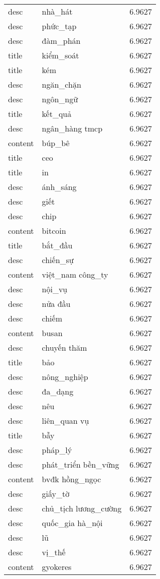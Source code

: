 \documentclass{article}
\begin{document}
\begin{tabular}{lll}
desc & nhà\_hát & 6.9627\\
desc & phức\_tạp & 6.9627\\
desc & đàm\_phán & 6.9627\\
title & kiểm\_soát & 6.9627\\
title & kém & 6.9627\\
desc & ngăn\_chặn & 6.9627\\
desc & ngôn\_ngữ & 6.9627\\
title & kết\_quả & 6.9627\\
desc & ngân\_hàng tmcp & 6.9627\\
content & búp\_bê & 6.9627\\
title & ceo & 6.9627\\
title & in & 6.9627\\
desc & ánh\_sáng & 6.9627\\
desc & giết & 6.9627\\
desc & chip & 6.9627\\
content & bitcoin & 6.9627\\
title & bắt\_đầu & 6.9627\\
desc & chiến\_sự & 6.9627\\
content & việt\_nam công\_ty & 6.9627\\
desc & nội\_vụ & 6.9627\\
desc & nửa đầu & 6.9627\\
desc & chiếm & 6.9627\\
content & busan & 6.9627\\
desc & chuyến thăm & 6.9627\\
title & bảo & 6.9627\\
desc & nông\_nghiệp & 6.9627\\
desc & đa\_dạng & 6.9627\\
desc & nêu & 6.9627\\
desc & liên\_quan vụ & 6.9627\\
title & bẫy & 6.9627\\
desc & pháp\_lý & 6.9627\\
desc & phát\_triển bền\_vững & 6.9627\\
content & bvđk hồng\_ngọc & 6.9627\\
desc & giấy\_tờ & 6.9627\\
desc & chủ\_tịch lương\_cường & 6.9627\\
desc & quốc\_gia hà\_nội & 6.9627\\
desc & lũ & 6.9627\\
desc & vị\_thế & 6.9627\\
content & gyokeres & 6.9627\\

\end{tabular}
\end{document}
